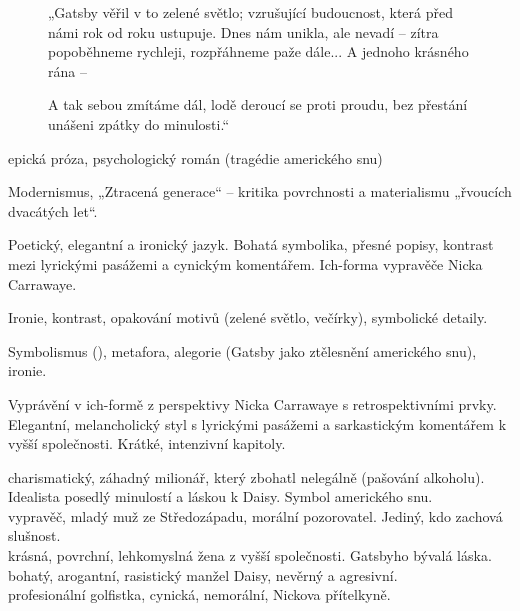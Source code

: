 \documentclass[FGBook.tex]{subfiles}
\begin{document}

\noindent\begin{figure}\footnotesize
{}
\setlength{\parindent}{3pt}
„Gatsby věřil v to zelené světlo; vzrušující budoucnost, která před námi rok od roku ustupuje. Dnes nám unikla, ale nevadí – zítra popoběhneme rychleji, rozpřáhneme paže dále... A jednoho krásného rána – 

A tak sebou zmítáme dál, lodě deroucí se proti proudu, bez přestání unášeni zpátky do minulosti.“
\end{figure}


\noindent epická próza, psychologický román (tragédie amerického snu)

\noindent Modernismus, „Ztracená generace“ – kritika povrchnosti a materialismu „řvoucích dvacátých let“.

\noindent Poetický, elegantní a ironický jazyk. Bohatá symbolika, přesné popisy, kontrast mezi lyrickými pasážemi a cynickým komentářem. Ich-forma vypravěče Nicka Carrawaye.

\noindent Ironie, kontrast, opakování motivů (zelené světlo, večírky), symbolické detaily.

\noindent Symbolismus (), metafora, alegorie (Gatsby jako ztělesnění amerického snu), ironie.

\noindent Vyprávění v ich-formě z perspektivy Nicka Carrawaye s retrospektivními prvky. Elegantní, melancholický styl s lyrickými pasážemi a sarkastickým komentářem k vyšší společnosti. Krátké, intenzivní kapitoly.

\noindent 
{} charismatický, záhadný milionář, který zbohatl nelegálně (pašování alkoholu). Idealista posedlý minulostí a láskou k Daisy. Symbol amerického snu.\\
 vypravěč, mladý muž ze Středozápadu, morální pozorovatel. Jediný, kdo zachová slušnost.\\
 krásná, povrchní, lehkomyslná žena z vyšší společnosti. Gatsbyho bývalá láska.\\
 bohatý, arogantní, rasistický manžel Daisy, nevěrný a agresivní.\\
 profesionální golfistka, cynická, nemorální, Nickova přítelkyně.
\end{document}
